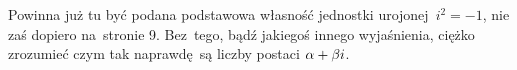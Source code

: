 \documentclass[a4paper,11pt]{article}
\begin{document}
\newpage
{} %

\vspace{\spaceTwo} \vspace{\spaceThree}




\start {} Powinna już tu być podana podstawowa własność jednostki
urojonej~$i^{ 2 } = -1$, nie zaś dopiero na~stronie 9. Bez~tego, bądź
jakiegoś innego wyjaśnienia, ciężko zrozumieć czym tak naprawdę~są
liczby postaci $\alpha + \beta i$.

\vspace{\spaceFour}
\end{document}
